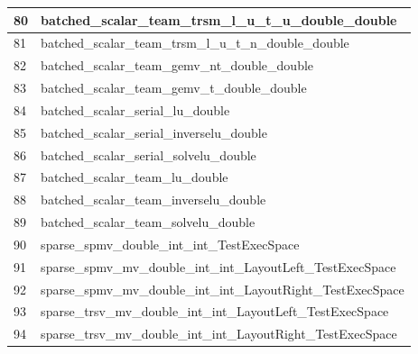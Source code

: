 \begin{table}[!htbp]
{\begin{tabular}{|>{\columncolor[HTML]{34FF34}}l |l|}
            \cellcolor[HTML]{FF00FF}80 & batched\_scalar\_team\_trsm\_l\_u\_t\_u\_double\_double             \\ \hline
            \cellcolor[HTML]{FF00FF}81 & batched\_scalar\_team\_trsm\_l\_u\_t\_n\_double\_double             \\ \hline
            82                         & batched\_scalar\_team\_gemv\_nt\_double\_double                     \\ \hline
            83                         & batched\_scalar\_team\_gemv\_t\_double\_double                      \\ \hline
            \cellcolor[HTML]{FE0000}84 & batched\_scalar\_serial\_lu\_double                                 \\ \hline
            \cellcolor[HTML]{FF00FF}85 & batched\_scalar\_serial\_inverselu\_double                          \\ \hline
            \cellcolor[HTML]{FF00FF}86 & batched\_scalar\_serial\_solvelu\_double                            \\ \hline
            \cellcolor[HTML]{D1B3FF}87 & batched\_scalar\_team\_lu\_double                                   \\ \hline
            \cellcolor[HTML]{FF00FF}88 & batched\_scalar\_team\_inverselu\_double                            \\ \hline
            \cellcolor[HTML]{FF00FF}89 & batched\_scalar\_team\_solvelu\_double                              \\ \hline
            \cellcolor[HTML]{0000FF}90 & sparse\_spmv\_double\_int\_int\_TestExecSpace                            \\ \hline
	    \cellcolor[HTML]{0000FF}91 & sparse\_spmv\_mv\_double\_int\_int\_LayoutLeft\_TestExecSpace              \\ \hline
	    \cellcolor[HTML]{0000FF}92 & sparse\_spmv\_mv\_double\_int\_int\_LayoutRight\_TestExecSpace             \\ \hline
	    \cellcolor[HTML]{0000FF}93 & sparse\_trsv\_mv\_double\_int\_int\_LayoutLeft\_TestExecSpace              \\ \hline
	    \cellcolor[HTML]{0000FF}94 & sparse\_trsv\_mv\_double\_int\_int\_LayoutRight\_TestExecSpace             \\ \hline 
	\end{tabular}}
      \label{tab:kokkos_tests}
   \end{table}


